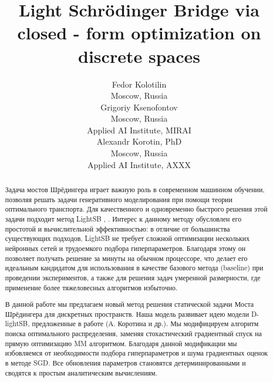 \documentclass{article}
\title{Light Schrödinger Bridge via closed - form optimization on discrete spaces}
\author{
  Fedor Kolotilin\\
  Moscow, Russia\\
  \And
  Grigoriy Ksenofontov\\
  Moscow, Russia\\
  Applied AI Institute, MIRAI\\
  \AND
  Alexandr Korotin, PhD\\
  Moscow, Russia\\
  Applied AI Institute, AXXX\\
}
\begin{document}
\maketitle

\begin{abstract}
    Задача мостов Шрёдингера играет важную роль в современном машинном обучении, позволяя решать задачи генеративного моделирования при помощи теории оптимального транспорта. Для качественного и одновременно быстрого решения этой задачи подходит метод LightSB  \cite{D-lightSB}, \cite{lightSB}. Интерес к данному методу обусловлен его простотой и вычислительной эффективностью: в отличие от большинства существующих подходов, LightSB не требует сложной оптимизации нескольких нейронных сетей и трудоемкого подбора гиперпараметров. Благодаря этому он позволяет получать решение за минуты на обычном процессоре, что делает его идеальным кандидатом для использования в качестве базового метода (baseline) при проведении экспериментов, а также для решения задач умеренной размерности, где применение более тяжеловесных алгоритмов избыточно.


    
    
    
    
    
   

    

    В данной работе мы предлагаем новый метод решения статической задачи Моста Шрёдингера для дискретных пространств. Наша модель развивает идею модели D-lightSB, предложенные в работе (А. Коротина и др.)\cite{D-lightSB}. Мы модифицируем алгоритм поиска оптимального распределения, заменяя стохастический градиентный спуск на прямую оптимизацию MM алгоритмом. Благодаря данной модификации мы избовляемся от необходимости подбора гиперпараметров и шума градиентных оценок в методе SGD. Все обновления параметров становятся детерминированными и сводятся к простым аналитическим вычислениям.

    
\end{abstract}
\end{document}

